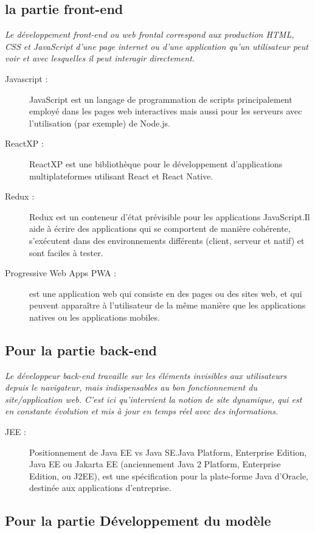 \subsection{ la partie front-end} 
\textit{Le développement front-end ou  web frontal correspond aux production HTML, CSS et JavaScript d’une page internet ou d’une application qu’un utilisateur peut voir et avec lesquelles il peut interagir directement.}
 \begin{description}
 \item[Javascript : ] JavaScript est un langage de programmation de scripts principalement employé dans les pages web interactives mais aussi pour les serveurs avec l'utilisation (par exemple) de Node.js.
 \item[ReactXP : ] ReactXP est une bibliothèque pour le développement d'applications multiplateformes utilisant React et React Native.
 \item[Redux : ] Redux est un conteneur d'état prévisible pour les applications JavaScript.Il  aide à écrire des applications qui se comportent de manière cohérente, s'exécutent dans des environnements différents (client, serveur et natif) et sont faciles à tester.
 \item[ Progressive Web Apps PWA : ]est une application web qui consiste en des pages ou des sites web, et qui peuvent apparaître à l'utilisateur de la même manière que les applications natives ou les applications mobiles.
 \end{description}

\subsection{Pour la partie back-end }
\textit{Le développeur back-end travaille sur les éléments invisibles aux utilisateurs depuis le navigateur, mais indispensables au bon fonctionnement du site/application web. C’est ici qu’intervient la notion de site dynamique, qui est en constante évolution et mis à jour en temps réel avec des informations. 
}
\begin{description}
\item[JEE : ] Positionnement de Java EE vs Java SE.Java Platform, Enterprise Edition, Java EE ou Jakarta EE (anciennement Java 2 Platform, Enterprise Edition, ou J2EE), est une spécification pour la plate-forme Java d'Oracle, destinée aux applications d'entreprise.
\end{description}

\subsection{Pour la partie Développement du modèle} 

